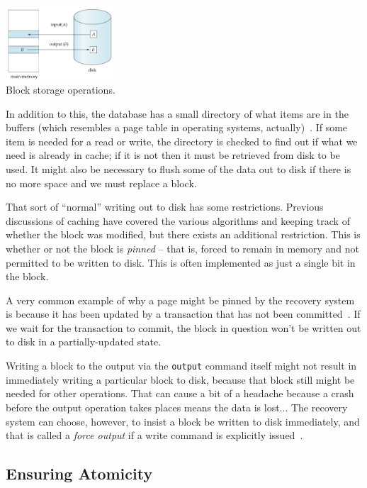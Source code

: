 \begin{center}
	\includegraphics[width=0.3\textwidth]{images/block-storage}\\
	Block storage operations.~\cite{dsc}
\end{center}

In addition to this, the database has a small directory of what items are in the buffers (which resembles a page table in operating systems, actually)~\cite{fds}. If some item is needed for a read or write, the directory is checked to find out if what we need is already in cache; if it is not then it must be retrieved from disk to be used. It might also be necessary to flush some of the data out to disk if there is no more space and we must replace a block.

That sort of ``normal'' writing out to disk has some restrictions. Previous discussions of caching have covered the various algorithms and keeping track of whether the block was modified, but there exists an additional restriction. This is whether or not the block is \textit{pinned} -- that is, forced to remain in memory and not permitted to be written to disk. This is often implemented as just a single bit in the block.

A very common example of why a page might be pinned by the recovery system is because it has been updated by a transaction that has not been committed~\cite{fds}. If we wait for the transaction to commit, the block in question won't be written out to disk in a partially-updated state.

Writing a block to the output via the \texttt{output} command itself might not result in immediately writing a particular block to disk, because that block still might be needed for other operations. That can cause a bit of a headache because a crash before the output operation takes places means the data is lost... The recovery system can choose, however, to insist a block be written to disk immediately, and that is called a \textit{force output} if a write command is explicitly issued~\cite{dsc}. 

\subsection*{Ensuring Atomicity}

